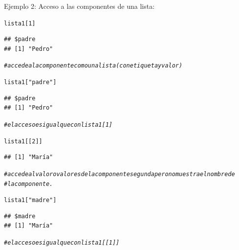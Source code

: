 \documentclass[12pt,letterpaper]{article}\usepackage[]{graphicx}\usepackage[]{color}
\makeatletter
\newcommand{\hlnum}[1]{\textcolor[rgb]{0.686,0.059,0.569}{#1}}%
\newcommand{\hlstr}[1]{\textcolor[rgb]{0.192,0.494,0.8}{#1}}%
\newcommand{\hlcom}[1]{\textcolor[rgb]{0.678,0.584,0.686}{\textit{#1}}}%
\newcommand{\hlstd}[1]{\textcolor[rgb]{0.345,0.345,0.345}{#1}}%
\newenvironment{kframe}{%
 \def\at@end@of@kframe{}%
 \ifinner\ifhmode%
  \def\at@end@of@kframe{\end{minipage}}%
  \begin{minipage}{\columnwidth}%
 \fi\fi%
 \def\FrameCommand##1{\hskip\@totalleftmargin \hskip-\fboxsep
 \colorbox{shadecolor}{##1}\hskip-\fboxsep
     \hskip-\linewidth \hskip-\@totalleftmargin \hskip\columnwidth}%
 \MakeFramed {\advance\hsize-\width
   \@totalleftmargin\z@ \linewidth\hsize
   \@setminipage}}%
 {\par\unskip\endMakeFramed%
 \at@end@of@kframe}
\newenvironment{knitrout}{}{} %
\makeatother
\begin{document}
Ejemplo 2: Acceso a las componentes de una lista: 
\begin{knitrout}
\color{fgcolor}\begin{kframe}
\begin{alltt}
\hlstd{lista1[}\hlnum{1}\hlstd{]}
\end{alltt}
\begin{verbatim}
## $padre
## [1] "Pedro"
\end{verbatim}
\begin{alltt}
\hlcom{#accede a la componente como una lista (con etiqueta y valor)}
\end{alltt}
\end{kframe}
\end{knitrout}
\begin{knitrout}
\color{fgcolor}\begin{kframe}
\begin{alltt}
\hlstd{lista1[}\hlstr{"padre"}\hlstd{]}
\end{alltt}
\begin{verbatim}
## $padre
## [1] "Pedro"
\end{verbatim}
\begin{alltt}
\hlcom{#el acceso es igual que con lista1[1] }
\end{alltt}
\end{kframe}
\end{knitrout}
\begin{knitrout}
\color{fgcolor}\begin{kframe}
\begin{alltt}
\hlstd{lista1[[}\hlnum{2}\hlstd{]]}
\end{alltt}
\begin{verbatim}
## [1] "María"
\end{verbatim}
\begin{alltt}
\hlcom{#accede al valor o valores de la componente segunda pero no muestra el nombre de}
\hlcom{#la componente.}
\end{alltt}
\end{kframe}
\end{knitrout}
\begin{knitrout}
\color{fgcolor}\begin{kframe}
\begin{alltt}
\hlstd{lista1[}\hlstr{"madre"}\hlstd{]}
\end{alltt}
\begin{verbatim}
## $madre
## [1] "María"
\end{verbatim}
\begin{alltt}
\hlcom{#el acceso es igual que con lista1[[1]]}
\end{alltt}
\end{kframe}
\end{knitrout}
\end{document}
